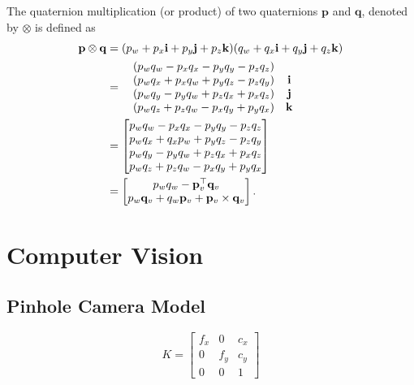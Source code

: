 \documentclass{article}
\renewcommand{\Vec}[1]{\mathbf{#1}}
\newcommand{\Transpose}[1]{{#1^{\top}}}
\begin{document}
The quaternion multiplication (or product) of two quaternions $\Vec{p}$ and
$\Vec{q}$, denoted by $\otimes$ is defined as
%
\begin{align}
  \Vec{p} \otimes \Vec{q} 
    &=
    (p_w + p_x \bold{i} + p_y \bold{j} + p_z \bold{k})
    (q_w + q_x \bold{i} + q_y \bold{j} + q_z \bold{k}) \\
    &=
    \begin{matrix}
      &(p_w q_w - p_x q_x - p_y q_y - p_z q_z)& \\
      &(p_w q_x + p_x q_w + p_y q_z - p_z q_y)& \bold{i}\\
      &(p_w q_y - p_y q_w + p_z q_x + p_x q_z)& \bold{j}\\
      &(p_w q_z + p_z q_w - p_x q_y + p_y q_x)& \bold{k}\\
    \end{matrix} \\
    &=
    \begin{bmatrix}
      p_w q_w - p_x q_x - p_y q_y - p_z q_z \\
      p_w q_x + q_x p_w + p_y q_z - p_z q_y \\
      p_w q_y - p_y q_w + p_z q_x + p_x q_z \\
      p_w q_z + p_z q_w - p_x q_y + p_y q_x \\
    \end{bmatrix} \\
    &=
    \begin{bmatrix}
      p_w q_w - \Transpose{\Vec{p}_{v}} \Vec{q}_{v} \\
      p_w \Vec{q}_{v} + q_w \Vec{p}_{v} + \Vec{p}_{v} \times \Vec{q}_{v}
    \end{bmatrix}.
\end{align}
%



\section{Computer Vision}

\subsection{Pinhole Camera Model}

\begin{equation}
  K =
  \begin{bmatrix}
    f_x & 0 & c_x \\
    0 & f_y & c_y \\
    0 & 0 & 1
  \end{bmatrix}
\end{equation}
\end{document}
